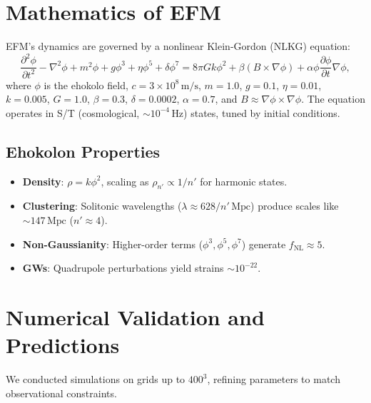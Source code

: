 \documentclass{article}
\begin{document}
\section{Mathematics of EFM}
EFM’s dynamics are governed by a nonlinear Klein-Gordon (NLKG) equation:
\begin{equation}
\frac{\partial^2 \phi}{\partial t^2} - \nabla^2 \phi + m^2 \phi + g \phi^3 + \eta \phi^5 + \delta \phi^7 = 8 \pi G k \phi^2 + \beta (B \times \nabla \phi) + \alpha \phi \frac{\partial \phi}{\partial t} \nabla \phi,
\label{eq:nlkg}
\end{equation}
where \(\phi\) is the ehokolo field, \( c = 3 \times 10^8 \, \text{m/s} \), \( m = 1.0 \), \( g = 0.1 \), \( \eta = 0.01 \), \( k = 0.005 \), \( G = 1.0 \), \(\beta = 0.3\), \(\delta = 0.0002\), \(\alpha = 0.7\), and \( B \approx \nabla \phi \times \nabla \phi \). The equation operates in S/T (cosmological, \(\sim 10^{-4} \, \text{Hz}\)) states, tuned by initial conditions.

\subsection{Ehokolon Properties}
\begin{itemize}
    \item \textbf{Density}: \(\rho = k \phi^2\), scaling as \(\rho_{n'} \propto 1/n'\) for harmonic states.
    \item \textbf{Clustering}: Solitonic wavelengths (\(\lambda \approx 628 / n' \, \text{Mpc}\)) produce scales like \(\sim 147 \, \text{Mpc}\) (\( n' \approx 4 \)).
    \item \textbf{Non-Gaussianity}: Higher-order terms (\(\phi^3, \phi^5, \phi^7\)) generate \( f_{\text{NL}} \approx 5 \).
    \item \textbf{GWs}: Quadrupole perturbations yield strains \(\sim 10^{-22}\).
\end{itemize}

\section{Numerical Validation and Predictions}
We conducted simulations on grids up to \(400^3\), refining parameters to match observational constraints.
\end{document}
